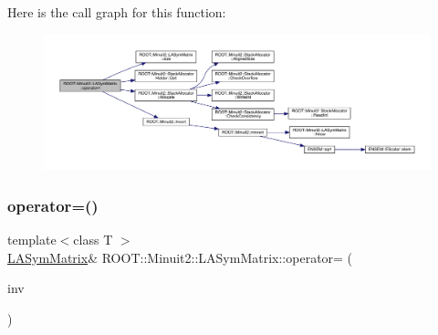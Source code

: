 Here is the call graph for this function\+:
\nopagebreak
\begin{figure}[H]
\begin{center}
\leavevmode
\includegraphics[width=350pt]{d3/d72/classROOT_1_1Minuit2_1_1LASymMatrix_a95fd77b55f726095a231817852fceb7d_cgraph}
\end{center}
\end{figure}
\mbox{\label{classROOT_1_1Minuit2_1_1LASymMatrix_a95fd77b55f726095a231817852fceb7d}} 
\subsubsection{\texorpdfstring{operator=()}{operator=()}\hspace{0.1cm}{\footnotesize\ttfamily [17/21]}}
{\footnotesize\ttfamily template$<$class T $>$ \\
\mbox{\hyperlink{classROOT_1_1Minuit2_1_1LASymMatrix}{L\+A\+Sym\+Matrix}}\& R\+O\+O\+T\+::\+Minuit2\+::\+L\+A\+Sym\+Matrix\+::operator= (\begin{DoxyParamCaption}\item[{const \mbox{\hyperlink{classROOT_1_1Minuit2_1_1ABObj}{A\+B\+Obj}}$<$ \mbox{\hyperlink{classROOT_1_1Minuit2_1_1sym}{sym}}, \mbox{\hyperlink{classROOT_1_1Minuit2_1_1MatrixInverse}{Matrix\+Inverse}}$<$ \mbox{\hyperlink{classROOT_1_1Minuit2_1_1sym}{sym}}, \mbox{\hyperlink{classROOT_1_1Minuit2_1_1ABObj}{A\+B\+Obj}}$<$ \mbox{\hyperlink{classROOT_1_1Minuit2_1_1sym}{sym}}, \mbox{\hyperlink{classROOT_1_1Minuit2_1_1LASymMatrix}{L\+A\+Sym\+Matrix}}, T $>$, T $>$, T $>$ \&}]{inv }\end{DoxyParamCaption})\hspace{0.3cm}{\ttfamily [inline]}}

